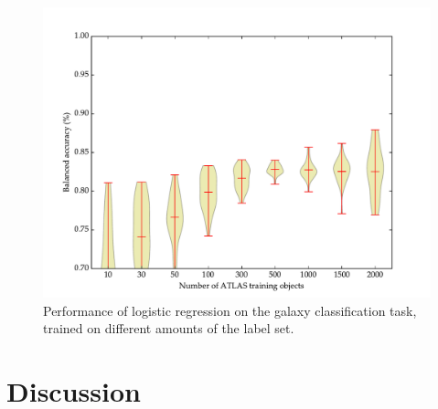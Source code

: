     \begin{figure}[!ht]
      \centering
      \includegraphics[width=\textwidth]{images/experiments/passive.pdf}
      \caption{Performance of logistic regression on the galaxy classification
        task, trained on different amounts of the \citeauthor{norris06} label
        set.}
    \end{figure}

\section{Discussion}
\label{sec:rgz-discussion}